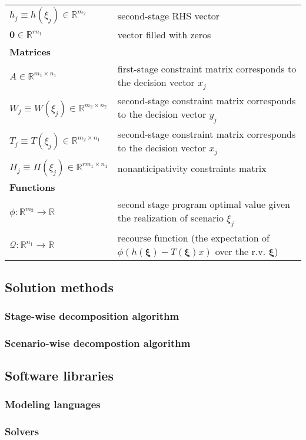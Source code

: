 \begin{table}[H]
{\begin{tabular}{ll}
			$h_j\equiv h(\xi_j)\in\mathbb{R}^{m_2}$	& second-stage RHS vector\\
			$\mathbf{0}\in\mathbb{R}^{rn_1}$	& vector filled with zeros \\ \midrule
			\textbf{Matrices} &  \\  \midrule
			$A\in\mathbb{R}^{m_1\times n_1}$	& first-stage constraint matrix corresponds to the decision vector $x_j$\\
			$W_j\equiv W(\xi_j)\in\mathbb{R}^{m_2\times n_2}$	& second-stage constraint matrix corresponds to the decision vector $y_j$\\
			$T_j\equiv T(\xi_j)\in\mathbb{R}^{m_2\times n_1}$	& second-stage constraint matrix corresponds to the decision vector $x_j$\\
			$H_j\equiv H(\xi_j)\in\mathbb{R}^{rm_1\times n_1}$	&	nonanticipativity constraints matrix \\ \midrule
			\textbf{Functions}	&	\\ \midrule
			$\phi:\mathbb{R}^{m_2}\to\mathbb{R}$	& second stage program optimal value given the realization of scenario $\xi_j$	\\
			$\mathcal{Q}:\mathbb{R}^{n_1}\to\mathbb{R}$	& recourse function (the expectation of $\phi\left( h(\pmb{\xi})-T(\pmb{\xi})x \right)$ over the r.v. $\pmb{\xi}$) 	\\
			\hline
		\end{tabular}
	}
\end{table} 


\subsection{Solution methods}
\subsubsection{Stage-wise decomposition algorithm}
\subsubsection{Scenario-wise decompostion algorithm}

\subsection{Software libraries}
\subsubsection{Modeling languages}
\subsubsection{Solvers}


